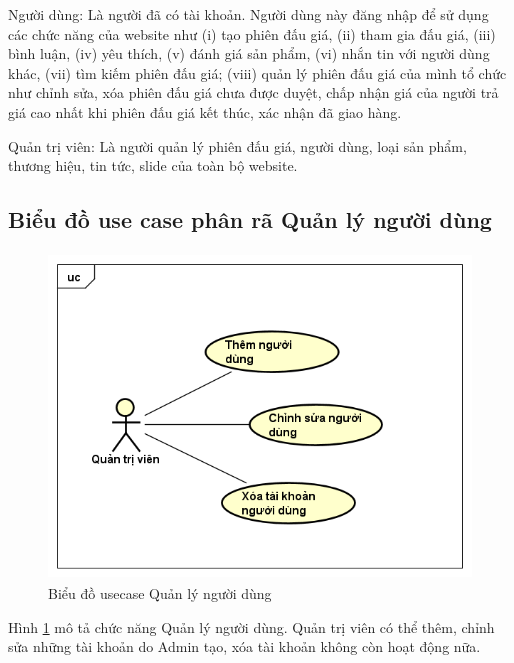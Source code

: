 \documentclass[../DoAn.tex]{subfiles}
\begin{document}
Người dùng: Là người đã có tài khoản. Người dùng này đăng nhập để sử dụng các chức năng của website như (i) tạo phiên đấu giá, (ii) tham gia đấu giá, (iii) bình luận, (iv) yêu thích, (v) đánh giá sản phẩm, (vi) nhắn tin với người dùng khác, (vii) tìm kiếm phiên đấu giá; (viii) quản lý phiên đấu giá của mình tổ chức như chỉnh sửa, xóa phiên đấu giá chưa được duyệt, chấp nhận giá của người trả giá cao nhất khi phiên đấu giá kết thúc, xác nhận đã giao hàng.

Quản trị viên: Là người quản lý phiên đấu giá, người dùng, loại sản phẩm, thương hiệu, tin tức, slide của toàn bộ website. 
\subsection{Biểu đồ use case phân rã Quản lý người dùng}
\begin{figure}[H]
    \centering
    \includegraphics[width=11.4cm,height=8.67cm]{Hinhve/uc quản lý người dùng.png}
    \caption{Biểu đồ usecase Quản lý người dùng}
    \label{fig:Fig22}
\end{figure}
Hình \ref{fig:Fig22} mô tả chức năng Quản lý người dùng. Quản trị viên có thể thêm, chỉnh sửa những tài khoản do Admin tạo, xóa tài khoản không còn hoạt động nữa.
\end{document}
